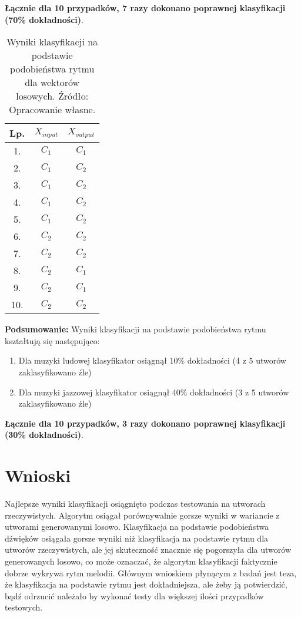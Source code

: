 \textbf{Łącznie dla 10 przypadków, 7 razy dokonano poprawnej klasyfikacji (70\% dokładności)}.
\FloatBarrier
\begin{table}[h]
\begin{tabular}{|c|c|c|}
\hline
Lp. & $X_{input}$ & $X_{output}$ \\ \hline
1.   & $C_{1}$      & $C_{1}$      \\ \hline
2.   & $C_{1}$      & $C_{2}$     \\ \hline
3.   & $C_{1}$      & $C_{2}$      \\ \hline
4.   & $C_{1}$      & $C_{2}$     \\ \hline
5.   & $C_{1}$      & $C_{2}$      \\ \hline
6.   & $C_{2}$      & $C_{2}$    \\ \hline
7.   & $C_{2}$      & $C_{2}$     \\ \hline
8.   & $C_{2}$      & $C_{1}$     \\ \hline
9.   & $C_{2}$      & $C_{1}$     \\ \hline
10.  & $C_{2}$      & $C_{2}$      \\ \hline
\end{tabular}
\centering
\caption{Wyniki klasyfikacji na podstawie podobieństwa rytmu dla wektorów losowych. Źródło: Opracowanie własne.}
\end{table}
\FloatBarrier

\textbf{Podsumowanie:}
Wyniki klasyfikacji na podstawie podobieństwa rytmu kształtują się następująco:

\begin{enumerate}
    \item Dla muzyki ludowej klasyfikator osiągnął 10\% dokładności (4 z 5 utworów zaklasyfikowano źle)
    \item Dla muzyki jazzowej klasyfikator osiągnął 40\% dokładności (3 z 5 utworów zaklasyfikowano źle)
\end{enumerate}

\textbf{Łącznie dla 10 przypadków, 3 razy dokonano poprawnej klasyfikacji (30\% dokładności)}.

\section{Wnioski}

Najlepsze wyniki klasyfikacji osiągnięto podczas testowania na utworach rzeczywistych. Algorytm osiągał porównywalnie gorsze wyniki w wariancie z utworami generowanymi losowo. Klasyfikacja na podstawie podobieństwa dźwięków osiągała gorsze wyniki niż klasyfikacja na podstawie rytmu dla utworów rzeczywistych, ale jej skuteczność znacznie się pogorszyła dla utworów generowanych losowo, co może oznaczać, że algorytm klasyfikacji faktycznie dobrze wykrywa rytm melodii. Głównym wnioskiem płynącym z badań jest teza, że klasyfikacja na podstawie rytmu jest dokładniejsza, ale żeby ją potwierdzić, bądź odrzucić należało by wykonać testy dla większej ilości przypadków testowych.
